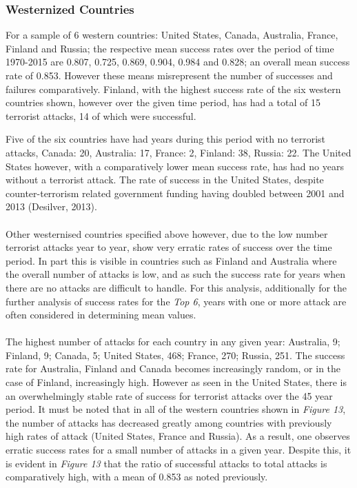 \documentclass[10pt,a4paper]{article}
\begin{document}
\subsubsection{Westernized Countries}
For a sample of 6 western countries: United States, Canada, Australia, France, Finland and Russia; the respective mean success rates over the period of time 1970-2015 are 0.807, 0.725, 0.869, 0.904, 0.984 and 0.828; an overall mean success rate of 0.853. However these means misrepresent the number of successes and failures comparatively. Finland, with the highest success rate of the six western countries shown, however over the given time period, has had a total of 15 terrorist attacks, 14 of which were successful. 

Five of the six countries have had years during this period with no terrorist attacks, Canada: 20, Australia: 17, France: 2, Finland: 38, Russia: 22. The United States however, with a comparatively lower mean success rate, has had no years without a terrorist attack. The rate of success in the United States, despite counter-terrorism related government funding having doubled between 2001 and 2013 (Desilver, 2013).
\\\\
Other westernised countries specified above however, due to the low number terrorist attacks year to year, show very erratic rates of success over the time period.
In part this is visible in countries such as Finland and Australia where the overall number of attacks is low, and as such the success rate for years when there are no attacks are difficult to handle.
For this analysis, additionally for the further analysis of success rates for the \textit{Top 6}, years with one or more attack are often considered in determining mean values. 
\\\\
The highest number of attacks for each country in any given year: Australia, 9; Finland, 9; Canada, 5; United States, 468; France, 270; Russia, 251. The success rate for Australia, Finland and Canada becomes increasingly random, or in the case of Finland, increasingly high. However as seen in the United States, there is an overwhelmingly stable rate of success for terrorist attacks over the 45 year period. It must be noted that in all of the western countries shown in \textit{Figure 13}, the number of attacks has decreased greatly among countries with previously high rates of attack (United States, France and Russia). As a result, one observes erratic success rates for a small number of attacks in a given year. Despite this, it is evident in \textit{Figure 13} that the ratio of successful attacks to total attacks is comparatively high, with a mean of 0.853 as noted previously.
\end{document}
